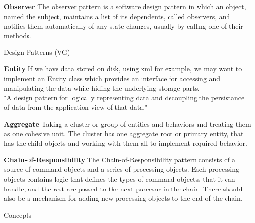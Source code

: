 \documentclass{article}
\begin{document}
\begin{Parallel}[v]{0.48\textwidth}{0.48\textwidth}
{        \textbf{Observer}\newline
        The observer pattern is a software design pattern in which an object,
        named the subject, maintains a list of its dependents, called observers,
        and notifies them automatically of any state changes, usually by calling
        one of their methods.
    }
    \ParallelPar
\end{Parallel}
\newpage


\begin{center}
    {\huge Design Patterns (VG)}
\end{center}

\textbf{Entity}\newline
If we have data stored on disk, using xml for example, we may want to implement an Entity class
which provides an interface for accessing and manipulating the data while hiding the underlying
storage parts.\\
"A design pattern for logically representing data and decoupling the persistance of data from the application view of that data."

\textbf{Aggregate}\newline
Taking a cluster or group of entities and behaviors and treating them as one cohesive unit.
The cluster has one aggregate root or primary entity, that has the child objects and
working with them all to implement required behavior.

\textbf{Chain-of-Responsibility}\newline
The Chain-of-Responsibility pattern consists of a source of command objects
and a series of processing objects. Each processing objects contains logic that
defines the types of command objectss that it can handle, and the rest are passed to the
next procesor in the chain. There should also be a mechanism for adding new processing
objects to the end of the chain.


\newpage
\begin{center}
    {\huge Concepts}
\end{center}
\end{document}
